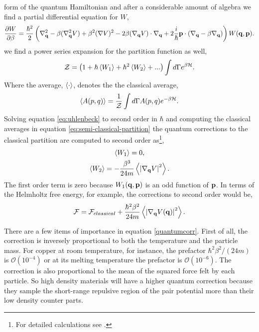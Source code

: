 form of the quantum Hamiltonian and after a considerable amount of algebra 
we find a partial differential equation for $W$,
%
\begin{equation} 
    \label{eq:uhlenbeck} 
    \frac{\partial W}{\partial \beta} = \frac{\hbar^2}{2} \left(
        \nabla_{\mathbf{q}}^2 
        - \beta(\nabla_{\mathbf{q}}^2V)
        + \beta^2(\nabla V)^2 
        - 2\beta(\nabla_{\mathbf{q}} V)\cdot\nabla_{\mathbf{q}}
        + 2 \frac{i}{\hbar}\mathbf{p}\cdot(\nabla_{\mathbf{q}} -\beta\nabla_{\mathbf{q}}) 
    \right)W(\mathbf{q}, \mathbf{p}).
\end{equation}
%
 we find a power series expansion for the partition
function as well,
%
\begin{equation}
    \label{eq:semi-classical-partition}
    \mathcal{Z} = \left(1 + \hbar \left\langle W_1 \right\rangle + \hbar^2 \left\langle W_2 \right\rangle+ ...\right)
        \int d\Gamma e^{\beta\mathcal{H}}.
\end{equation}
%
Where the average, $\left\langle \cdot \right\rangle$, denotes the the classical average, 
%
\begin{equation} \langle A(p, q) \rangle = \frac{1}{\mathcal{Z}} \int d\Gamma A(p, q)
e^{-\beta \mathcal{H}}.  \end{equation}
%
Solving equation \ref{eq:uhlenbeck} to second order in $\hbar$ and computing
the classical averages in equation \ref{eq:semi-classical-partition} the
quantum corrections to the classical partition are computed to second 
order as\footnote{For detailed calculations see \cite{LANDAU198079}.},
%
\begin{gather}
    \left\langle W_1 \right\rangle= 0, \\
    \left\langle W_2 \right\rangle = - \frac{\beta^3}{24 m} \left\langle \left\vert\nabla_{\mathbf{q}} V \right\vert^2 \right\rangle.
\end{gather}
%
The first order term is zero because $W_1(\mathbf{q}, \mathbf{p})$ is an odd function of $\mathbf{p}$.
In terms of the Helmholtz free energy, for example, the corrections to second
order would be, 
%
\begin{equation}
    \label{quantumcorr}
    \mathcal{F} = \mathcal{F}_{classical} + \frac{\hbar^2\beta^2}{24m}
        \left\langle  \left\vert \nabla_{\mathbf{q}} V(\mathbf{q}) \right\vert^2  \right\rangle.
\end{equation}

There are a few items of importance in equation \ref{quantumcorr}. First of
all, the correction is inversely proportional to both the temperature and the
particle mass.  For copper at room temperature, for instance, the prefactor
$\hbar^2\beta^2/(24 m)$ is $\mathcal{O}(10^{-4})$ or at its melting temperature
the prefactor is $\mathcal{O}(10^{-6})$.  The correction is also proportional
to the mean of the squared force felt by each particle. So high density
materials will have a higher quantum correction because they sample the
short-range repulsive region of the pair potential more than their low density
counter parts.

